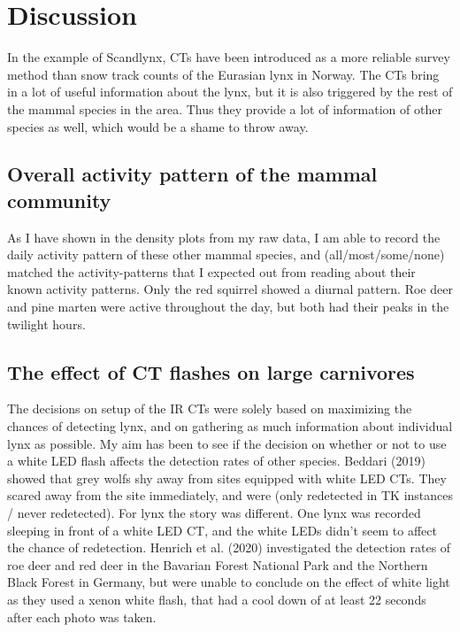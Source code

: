 \chapter{Discussion}

In the example of Scandlynx, CTs have been introduced as a more reliable survey method than snow track counts of the Eurasian lynx in Norway. The CTs bring in a lot of useful information about the lynx, but it is also triggered by the rest of the mammal species in the area. Thus they provide a lot of information of other species as well, which would be a shame to throw away.

\section{Overall activity pattern of the mammal community}

As I have shown %
in the density plots from my raw data, I am able to record the daily activity pattern of these other mammal species, and (all/most/some/none) matched the activity-patterns that I expected out from reading about their known activity patterns. %
Only the red squirrel showed a diurnal pattern. Roe deer and pine marten were active throughout the day, but both had their peaks in the twilight hours.



\section{The effect of CT flashes on large carnivores}

The decisions on setup of the IR CTs were solely based on maximizing the chances of detecting lynx, and on gathering as much information about individual lynx as possible. My aim has been to see if the decision on whether or not to use a white LED flash affects the detection rates of other species. Beddari (2019) showed that grey wolfs shy away from sites equipped with white LED CTs. They scared away from the site immediately, and were (only redetected in TK instances / never redetected). For lynx the story was different. One lynx was recorded sleeping in front of a white LED CT, and the white LEDs didn’t seem to affect the chance of redetection. Henrich et al. (2020) investigated the detection rates of roe deer and red deer in the Bavarian Forest National Park and the Northern Black Forest in Germany, but were unable to conclude on the effect of white light as they used a xenon white flash, that had a cool down of at least 22 seconds after each photo was taken.

